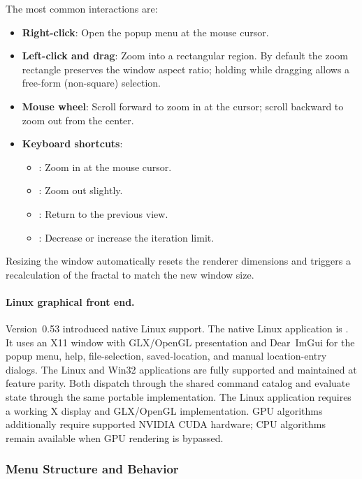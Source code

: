 The most common interactions are:
\begin{itemize}
  \item \textbf{Right-click}: Open the popup menu at the mouse cursor.
  \item \textbf{Left-click and drag}: Zoom into a rectangular region.
        By default the zoom rectangle preserves the window aspect ratio;
        holding  while dragging allows a free-form
        (non-square) selection.
  \item \textbf{Mouse wheel}: Scroll forward to zoom in at the cursor;
        scroll backward to zoom out from the center.
  \item \textbf{Keyboard shortcuts}:
    \begin{itemize}
      \item {}: Zoom in at the mouse cursor.
      \item {}: Zoom out slightly.
      \item {}: Return to the previous view.
      \item \code{- / =}: Decrease or increase the iteration limit.
    \end{itemize}
\end{itemize}

Resizing the window automatically resets the renderer dimensions and triggers
a recalculation of the fractal to match the new window size.

\paragraph{Linux graphical front end.}
Version~0.53 introduced native Linux support. The native Linux application is
. It uses an X11 window with GLX/OpenGL presentation
and Dear~ImGui for the popup menu, help, file-selection, saved-location, and
manual location-entry dialogs. The Linux and Win32 applications are fully
supported and maintained at feature parity. Both dispatch through the shared
command catalog and evaluate state through the same portable implementation.
The Linux application requires a working X display and GLX/OpenGL
implementation. GPU algorithms additionally require supported NVIDIA CUDA
hardware; CPU algorithms remain available when GPU rendering is bypassed.

\subsubsection{Menu Structure and Behavior}

